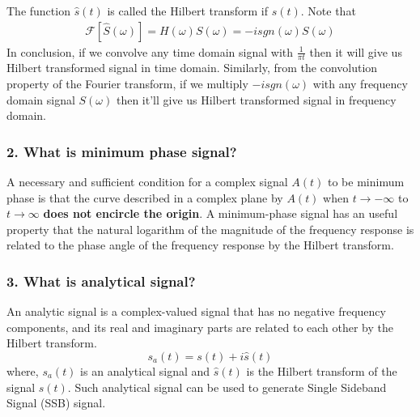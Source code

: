 The function $\hat{s}(t)$ is called the Hilbert transform if $s(t)$. Note that
\begin{equation}
\begin{split}
\mathcal{F}[\hat{S}(\omega)]=H(\omega)S(\omega)=-isgn(\omega)S(\omega)
\end{split}
\label{}
\end{equation}
In conclusion, if we convolve any time domain signal with $\frac{1}{\pi t}$ then it will give us Hilbert transformed signal in time domain. Similarly, from the convolution property of the Fourier transform, if we multiply $-isgn(\omega)$ with any frequency domain signal $S(\omega)$ then it'll give us Hilbert transformed signal in frequency domain.


\subsubsection{2. What is minimum phase signal?}
A necessary and sufficient condition for a complex signal $A(t)$ to be minimum phase is that the curve described in a complex plane by $A(t)$ when $t\rightarrow -\infty$ to $t\rightarrow \infty$ \textbf{does not encircle the origin}. A minimum-phase signal has an useful property that the natural logarithm of the magnitude of the frequency response is related to the phase angle of the frequency response by the Hilbert transform.


\subsubsection{3. What is analytical signal?}
An analytic signal is a complex-valued signal that has no negative frequency components, and its real and imaginary parts are related to each other by the Hilbert transform.
\begin{equation}
s_a(t)=s(t)+i\hat{s}(t)
\label{Analytical signal}
\end{equation}
where, $s_a(t)$ is an analytical signal and $\hat{s}(t)$ is the Hilbert transform of the signal ${s}(t)$. Such analytical signal can be used to generate Single Sideband Signal (SSB) signal.


